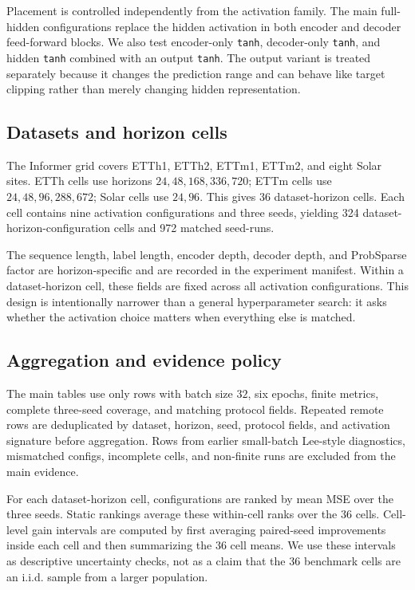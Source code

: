 Placement is controlled independently from the activation family. The main full-hidden configurations replace the hidden activation in both encoder and decoder feed-forward blocks. We also test encoder-only \texttt{tanh}, decoder-only \texttt{tanh}, and hidden \texttt{tanh} combined with an output \texttt{tanh}. The output variant is treated separately because it changes the prediction range and can behave like target clipping rather than merely changing hidden representation.

\subsection{Datasets and horizon cells}

The Informer grid covers ETTh1, ETTh2, ETTm1, ETTm2, and eight Solar sites. ETTh cells use horizons \(24,48,168,336,720\); ETTm cells use \(24,48,96,288,672\); Solar cells use \(24,96\). This gives 36 dataset-horizon cells. Each cell contains nine activation configurations and three seeds, yielding 324 dataset-horizon-configuration cells and 972 matched seed-runs.

The sequence length, label length, encoder depth, decoder depth, and ProbSparse factor are horizon-specific and are recorded in the experiment manifest. Within a dataset-horizon cell, these fields are fixed across all activation configurations. This design is intentionally narrower than a general hyperparameter search: it asks whether the activation choice matters when everything else is matched.

\subsection{Aggregation and evidence policy}

The main tables use only rows with batch size \(32\), six epochs, finite metrics, complete three-seed coverage, and matching protocol fields. Repeated remote rows are deduplicated by dataset, horizon, seed, protocol fields, and activation signature before aggregation. Rows from earlier small-batch Lee-style diagnostics, mismatched configs, incomplete cells, and non-finite runs are excluded from the main evidence.

For each dataset-horizon cell, configurations are ranked by mean MSE over the three seeds. Static rankings average these within-cell ranks over the 36 cells. Cell-level gain intervals are computed by first averaging paired-seed improvements inside each cell and then summarizing the 36 cell means. We use these intervals as descriptive uncertainty checks, not as a claim that the 36 benchmark cells are an i.i.d. sample from a larger population.

